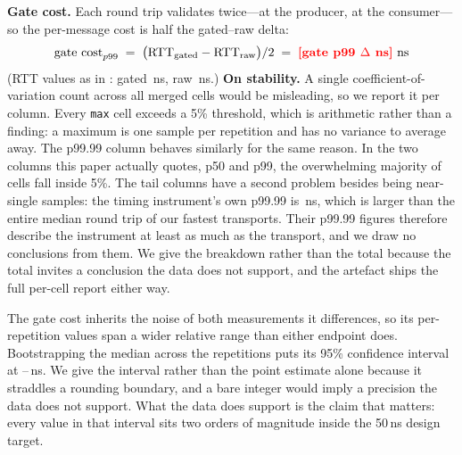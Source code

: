 \begin{table}[t]
\centering\footnotesize
\setlength{\tabcolsep}{4pt}

\caption{Round-trip p50 / p99 / p99.99 latency at 256\,B payload,
sorted by p99. Auto-generated by \texttt{plot\_paper1\_figure.py}.
Aeron is the one row measured without core isolation, for the reason
given in ; its p99.99 is host scheduling on a
four-core mobile part rather than a property of Aeron, and we draw no
conclusion from it.}
\label{tab:rtt}
\end{table}

\textbf{Gate cost.} Each round trip validates twice---\IPCSEND at the
producer, \IPCRECV at the consumer---so the per-message cost is half
the gated--raw delta:
\begin{equation*}
\text{gate cost}_{p99} \;=\;
\bigl(\text{RTT}_{\text{gated}} - \text{RTT}_{\text{raw}}\bigr) / 2
\;=\; \textcolor{red}{\textbf{[gate p99 $\Delta$ ns]}}\ \text{ns}
\end{equation*}
(RTT values as in : gated \gatedAstraRTT\,ns, raw
\rawAstraRTT\,ns.)
\textbf{On stability.} A single coefficient-of-variation count across
all merged cells would be misleading, so we report it per column.
Every \texttt{max} cell exceeds a 5\% threshold, which is arithmetic
rather than a finding: a maximum is one sample per repetition and has
no variance to average away. The p99.99 column behaves similarly for
the same reason. In the two columns this paper actually quotes, p50 and
p99, the overwhelming majority of cells fall inside 5\%. The tail
columns have a second problem besides being near-single samples: the
timing instrument's own p99.99 is \timerFloorTail\,ns, which is larger
than the entire median round trip of our fastest transports. Their
p99.99 figures therefore describe the instrument at least as much as the
transport, and we draw no conclusions from them. We give the
breakdown rather than the total because the total invites a conclusion
the data does not support, and the artefact ships the full per-cell
report either way.

The gate cost inherits the noise of both measurements it differences,
so its per-repetition values span a wider relative range than either
endpoint does. Bootstrapping the median across the repetitions puts its
95\% confidence interval at \gateCostCILo--\gateCostCIHi\,ns. We give
the interval rather than the point estimate alone because it straddles a
rounding boundary, and a bare integer would imply a precision the data
does not support. What the data does support is the claim that matters:
every value in that interval sits two orders of magnitude inside the
50\,ns design target.

